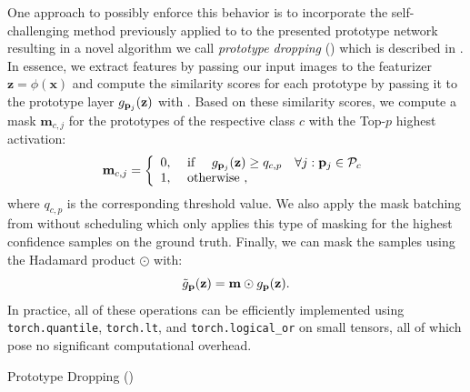 One approach to possibly enforce this behavior is to incorporate the self-challenging method previously applied to \divcam to the presented prototype network resulting in a novel algorithm we call \emph{prototype dropping} (\prodrop) which is described in . In essence, we extract features by passing our input images to the featurizer $\mathbf{z} = \phi(\mathbf{x})$ and compute the similarity scores for each prototype by passing it to the prototype layer $g_{\mathbf{p}_{j}}(\mathbf{z})$ with . Based on these similarity scores, we compute a mask $\mathbf{m}_{c,j}$ for the prototypes of the respective class $c$ with the Top-$p$ highest activation:
\begin{equation}
\mathbf{m}_{c,j}=\left\{\begin{array}{ll}
0, & \text { if } \quad g_{\mathbf{p}_{j}}(\mathbf{z}) \geq q_{c, p}\quad \forall j: \mathbf{p}_{j} \in \mathcal{P}_c \\
1, & \text { otherwise },
\end{array}\right.
\label{eq:ProDropFeatureMask}
\end{equation}
where $q_{c, p}$ is the corresponding threshold value. We also apply the mask batching from \divcam without scheduling which only applies this type of masking for the highest confidence samples on the ground truth. Finally, we can mask the samples using the Hadamard product $\odot$ with:
\begin{equation}
\label{eq:mutate_prodrop}
\Tilde{g}_{\mathbf{p}}(\mathbf{z}) = \mathbf{m} \odot g_{\mathbf{p}}(\mathbf{z}).
\end{equation}
In practice, all of these operations can be efficiently implemented using \texttt{torch.quantile}, \texttt{torch.lt}, and \texttt{torch.logical\_or} on small tensors, all of which pose no significant computational overhead.

\begin{algorithm}[t]
    \SetAlgoLined
    \BlankLine
\caption{Prototype Dropping (\prodrop)}
\label{alg:ProDrop}
\end{algorithm}


